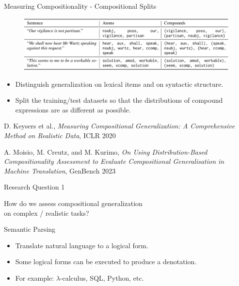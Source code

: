 \documentclass{beamer}
\begin{document}
\begin{frame}{Measuring Compositionality - Compositional Splits}
    \begin{figure}
        \centering
        \includegraphics[width=\textwidth]{dbca.png}
    \end{figure}
    \begin{itemize}
        \item Distinguish generalization on lexical items and on syntactic structure.
        \item Split the training/test datasets so that the distributions of compound expressions are as different as possible.
    \end{itemize}

    \vfill

    \tiny{D. Keysers et al., \emph{Measuring Compositional Generalization: A Comprehensive Method on Realistic Data}, ICLR 2020}
    
    \tiny{A. Moisio, M. Creutz, and M. Kurimo, \emph{On Using Distribution-Based Compositionality Assessment to Evaluate Compositional Generalisation in Machine Translation}, GenBench 2023}
\end{frame}

\begin{frame}{Research Question 1}
    \begin{center}
        How do we assess compositional generalization\\on complex / realistic tasks?
    \end{center}
\end{frame}

\begin{frame}{Semantic Parsing}
    \begin{itemize}
        \item Translate natural language to a logical form.

        \pause

        \item Some logical forms can be executed to produce a denotation.

        \pause

        \item For example: $\lambda$-calculus, SQL, Python, etc.
    \end{itemize}
\end{frame}
\end{document}
